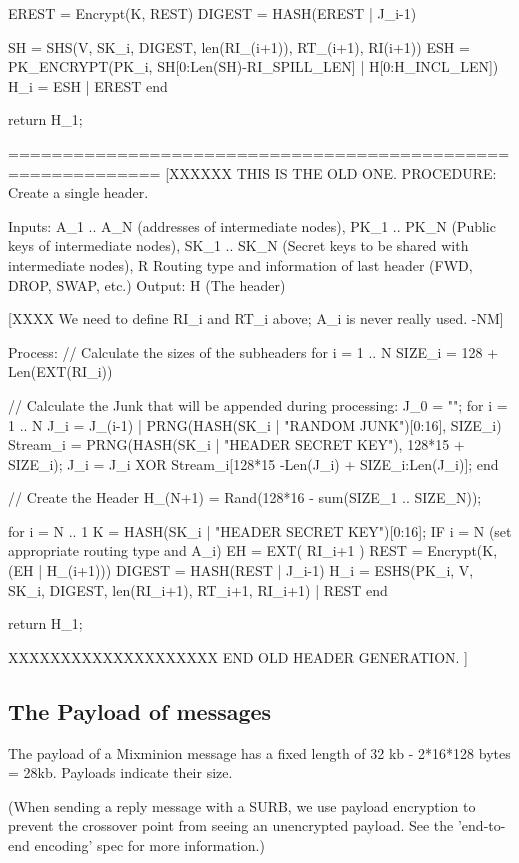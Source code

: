         EREST = Encrypt(K, REST)
        DIGEST = HASH(EREST | J_i-1)

        SH = SHS(V, SK_i, DIGEST, len(RI_(i+1)), RT_(i+1), RI(i+1))
        ESH = PK_ENCRYPT(PK_i, 
                         SH[0:Len(SH)-RI_SPILL_LEN] |
                         H[0:H_INCL_LEN]) 
        H_i = ESH | EREST
  end

return H_1;

============================================================
[XXXXXX THIS IS THE OLD ONE.
PROCEDURE: Create a single header.

Inputs: A_1 .. A_N (addresses of intermediate nodes), 
        PK_1 .. PK_N (Public keys of intermediate nodes),
        SK_1 .. SK_N (Secret keys to be shared with intermediate nodes),
        R Routing type and information of last header (FWD, DROP, SWAP, etc.)
Output: H (The header)

[XXXX We need to define RI_i and RT_i above; A_i is never really
   used. -NM]

Process: 
  // Calculate the sizes of the subheaders
  for i = 1 .. N
        SIZE_i = 128 + Len(EXT(RI_i))

  // Calculate the Junk that will be appended during processing:
  J_0 = "";
  for i = 1 .. N
        J_i = J_(i-1) | PRNG(HASH(SK_i | "RANDOM JUNK")[0:16], SIZE_i)
        Stream_i = PRNG(HASH(SK_i | "HEADER SECRET KEY"), 128*15 + SIZE_i);
        J_i = J_i XOR Stream_i[128*15 -Len(J_i) + SIZE_i:Len(J_i)];
  end

  // Create the Header
  H_(N+1) = Rand(128*16 - sum(SIZE_1 .. SIZE_N));

  for i = N .. 1
        K = HASH(SK_i | "HEADER SECRET KEY")[0:16];
        IF i = N (set appropriate routing type and A_i)
        EH = EXT( RI_i+1 )
        REST = Encrypt(K, (EH | H_(i+1)))
        DIGEST = HASH(REST | J_i-1)
        H_i = ESHS(PK_i, V, SK_i, DIGEST, len(RI_i+1), RT_i+1, RI_i+1) | REST
  end

return H_1;

XXXXXXXXXXXXXXXXXXXX END OLD HEADER GENERATION. ]

\subsection{The Payload of messages}

The payload of a Mixminion message has a fixed length of 32 kb
- 2*16*128 bytes = 28kb.   Payloads indicate their size.

(When sending a reply message with a SURB, we use payload encryption
to prevent the crossover point from seeing an unencrypted payload. See
the 'end-to-end encoding' spec for more information.)

